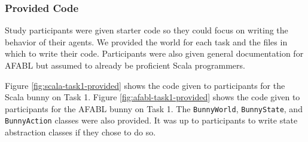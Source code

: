 






\subsubsection{Provided Code}

Study participants were given starter code so they could focus on writing the behavior of their agents. We provided the world for each task and the files in which to write their code. Participants were also given general documentation for AFABL but assumed to already be proficient Scala programmers.

Figure \ref{fig:scala-task1-provided} shows the code given to participants for the Scala bunny on Task 1. Figure \ref{fig:afabl-task1-provided} shows the code given to participants for the AFABL bunny on Task 1. The {\tt BunnyWorld}, {\tt BunnyState}, and {\tt BunnyAction} classes were also provided. It was up to participants to write state abstraction classes if they chose to do so.


